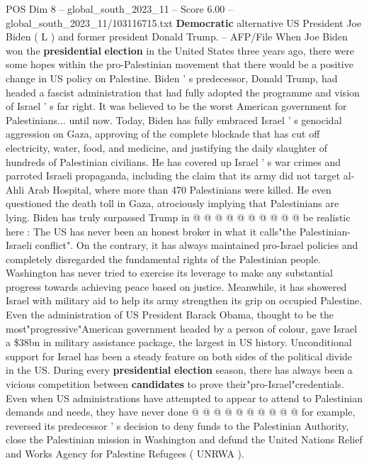 \begin{textsample}{POS Dim 8 – global\_south\_2023\_11 – Score 6.00 – global\_south\_2023\_11/103116715.txt}  \label{ex:f8_pos_274}
\textbf{Democratic} alternative US President Joe Biden ( L ) and former president Donald Trump. -- AFP/File When Joe Biden won the \textbf{presidential} \textbf{election} in the United States three years ago, there were some hopes within the pro-Palestinian movement that there would be a positive change in US policy on Palestine.
Biden ' s predecessor, Donald Trump, had headed a fascist administration that had fully adopted the programme and vision of Israel ' s far right.
It was believed to be the worst American government for Palestinians... until now.
Today, Biden has fully embraced Israel ' s genocidal aggression on Gaza, approving of the complete blockade that has cut off electricity, water, food, and medicine, and justifying the daily slaughter of hundreds of Palestinian civilians.
He has covered up Israel ' s war crimes and parroted Israeli propaganda, including the claim that its army did not target al-Ahli Arab Hospital, where more than 470 Palestinians were killed.
He even questioned the death toll in Gaza, atrociously implying that Palestinians are lying.
Biden has truly surpassed Trump in @ @ @ @ @ @ @ @ @ @ be realistic here : The US has never been an honest broker in what it calls"the Palestinian-Israeli conflict".
On the contrary, it has always maintained pro-Israel policies and completely disregarded the fundamental rights of the Palestinian people.
Washington has never tried to exercise its leverage to make any substantial progress towards achieving peace based on justice.
Meanwhile, it has showered Israel with military aid to help its army strengthen its grip on occupied Palestine.
Even the administration of US President Barack Obama, thought to be the most"progressive"American government headed by a person of colour, gave Israel a \$38bn in military assistance package, the largest in US history.
Unconditional support for Israel has been a steady feature on both sides of the political divide in the US.
During every \textbf{presidential} \textbf{election} season, there has always been a vicious competition between \textbf{candidates} to prove their"pro-Israel"credentials.
Even when US administrations have attempted to appear to attend to Palestinian demands and needs, they have never done @ @ @ @ @ @ @ @ @ @ for example, reversed its predecessor ' s decision to deny funds to the Palestinian Authority, close the Palestinian mission in Washington and defund the United Nations Relief and Works Agency for Palestine Refugees ( UNRWA ).

\end{textsample}
